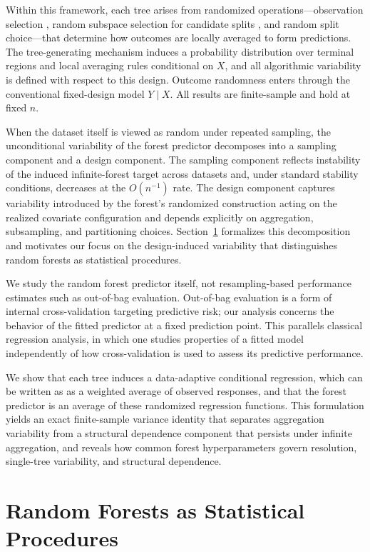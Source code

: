 \documentclass[11pt]{article}
\theoremstyle{plain}
\theoremstyle{definition}
\theoremstyle{remark}
\begin{document}
Within this framework, each tree arises from randomized operations---observation selection \citep{breiman1996}, random subspace selection for candidate splits \citep{ho1998}, and random split choice---that determine how outcomes are locally averaged to form predictions. The tree-generating mechanism induces a probability distribution over terminal regions and local averaging rules conditional on $X$, and all algorithmic variability is defined with respect to this design. Outcome randomness enters through the conventional fixed-design model $Y \mid X$. All results are finite-sample and hold at fixed $n$.

When the dataset itself is viewed as random under repeated sampling, the unconditional variability of the forest predictor decomposes into a sampling component and a design component. The sampling component reflects instability of the induced infinite-forest target across datasets and, under standard stability conditions, decreases at the $O(n^{-1})$ rate. The design component captures variability introduced by the forest's randomized construction acting on the realized covariate configuration and depends explicitly on aggregation, subsampling, and partitioning choices. Section~\ref{sec:rf_procedures} formalizes this decomposition and motivates our focus on the design-induced variability that distinguishes random forests as statistical procedures.

We study the random forest predictor itself, not resampling-based performance estimates such as out-of-bag evaluation. Out-of-bag evaluation is a form of internal cross-validation targeting predictive risk; our analysis concerns the behavior of the fitted predictor at a fixed prediction point. This parallels classical regression analysis, in which one studies properties of a fitted model independently of how cross-validation is used to assess its predictive performance.

We show that each tree induces a data-adaptive conditional regression, which can be written as as a weighted average of observed responses, and that the forest predictor is an average of these randomized regression functions. This formulation yields an exact finite-sample variance identity that separates aggregation variability from a structural dependence component that persists under infinite aggregation, and reveals how common forest hyperparameters govern resolution, single-tree variability, and structural dependence.

\section{Random Forests as Statistical Procedures}
\label{sec:rf_procedures}
\end{document}
